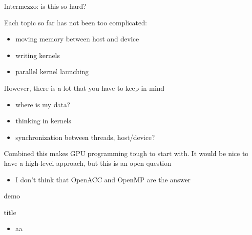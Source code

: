 \documentclass[aspectratio=43]{beamer}
\begin{document}
\begin{frame}[fragile]{Intermezzo: is this so hard?}
    \begin{info}{}
        Each topic so far has not been too complicated:
        \begin{itemize}
            \item moving memory between host and device
            \item writing kernels
            \item parallel kernel launching
        \end{itemize}
        However, there is a lot that you have to keep in mind
        \begin{itemize}
            \item where is my data?
            \item thinking in kernels
            \item synchronization between threads, host/device?
        \end{itemize}
        Combined this makes GPU programming tough to start with.
        It would be nice to have a high-level approach, but this is an open question
        \begin{itemize}
            \item I don't think that OpenACC and OpenMP are the answer
        \end{itemize}
    \end{info}

\end{frame}


\begin{frame}[fragile]{demo}
    \begin{info}{title}
        \begin{itemize}
            \item aa
        \end{itemize}
    \end{info}

\end{frame}
\end{document}
